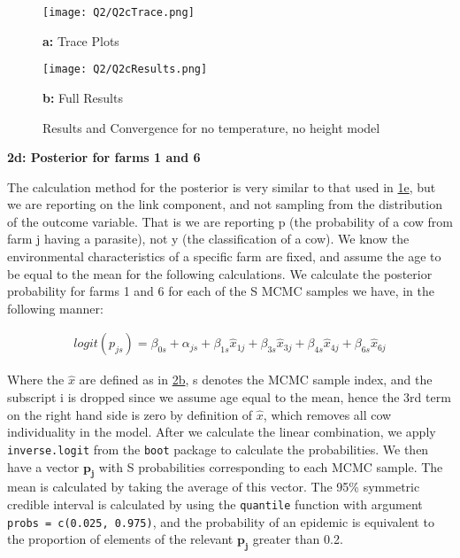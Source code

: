 \documentclass[11pt]{article}
\begin{document}
\begin{figure}[!h]
    \begin{minipage}[l]{0.5\textwidth}
        \texttt{[image: Q2/Q2cTrace.png]}
        \centerline{\textbf{a:} Trace Plots}
    \end{minipage}
    \begin{minipage}[pos=r]{0.5\textwidth}
        \texttt{[image: Q2/Q2cResults.png]}
        \centerline{\textbf{b:} Full Results}
    \end{minipage}
\caption{Results and Convergence for no temperature, no height model} \label{Fig::2cTraceResults}
\end{figure}


\newpage


\textbf{2d: Posterior for farms 1 and 6}

The calculation method for the posterior is very similar to that used in \hyperref[sec::1e]{1e}, but we are reporting on the link component, and not sampling from the distribution of the outcome variable. That is we are reporting p (the probability of a cow from farm j having a parasite), not y (the classification of a cow). We know the environmental characteristics of a specific farm are fixed, and assume the age to be equal to the mean for the following calculations. We calculate the posterior probability for farms 1 and 6 for each of the S MCMC samples we have, in the following manner:

\vspace*{-4mm}

\begin{align*}
logit(p_{js}) = \beta_{0s} + \alpha_{js} + \beta_{1s}\widehat{x}_{1j} + \beta_{3s}\widehat{x}_{3j} + \beta_{4s}\widehat{x}_{4j}+ \beta_{6s}\widehat{x}_{6j}
\end{align*}

\vspace*{4mm}

Where the $\widehat{x}$ are defined as in \hyperref[sec::2b]{2b}, s denotes the MCMC sample index, and the subscript i is dropped since we assume age equal to the mean, hence the 3rd term on the right hand side is zero by definition of $\widehat{x}$, which removes all cow individuality in the model. After we calculate the linear combination, we apply \texttt{inverse.logit} from the \texttt{boot} package to calculate the probabilities. We then have a vector $\boldsymbol{p_j}$ with S probabilities corresponding to each MCMC sample. The mean is calculated by taking the average of this vector. The 95\% symmetric credible interval is calculated by using the \texttt{quantile} function with argument \texttt{probs = c(0.025, 0.975)}, and the probability of an epidemic is equivalent to the proportion of elements of the relevant $\boldsymbol{p_j}$ greater than 0.2.
\end{document}
